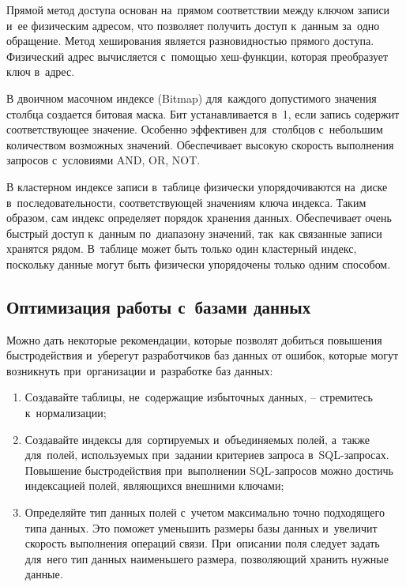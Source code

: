 \documentclass{ou}
\begin{document}
Прямой метод доступа основан на~прямом соответствии между ключом записи и~ее физическим адресом, что позволяет получить доступ к~данным за~одно обращение. Метод хеширования является разновидностью прямого доступа. Физический адрес вычисляется с~помощью хеш-функции, которая преобразует ключ в~адрес.

В двоичном масочном индексе (Bitmap) для~каждого допустимого значения столбца создается битовая маска. Бит устанавливается в~1, если запись содержит соответствующее значение. Особенно эффективен для~столбцов с~небольшим количеством возможных значений. Обеспечивает высокую скорость выполнения запросов с~условиями AND, OR, NOT\cite{Senchenko2015}.

В кластерном индексе записи в~таблице физически упорядочиваются на~диске в~последовательности, соответствующей значениям ключа индекса. Таким образом, сам индекс определяет порядок хранения данных. Обеспечивает очень быстрый доступ к~данным по~диапазону значений, так~как связанные записи хранятся рядом. В~таблице может быть только один кластерный индекс, поскольку данные могут быть физически упорядочены только одним способом.

\subsection{Оптимизация работы с~базами данных}
Можно дать некоторые рекомендации, которые позволят добиться повышения быстродействия и~уберегут разработчиков баз данных от ошибок, которые могут возникнуть при~организации и~разработке баз данных:
\begin{enumerate}[leftmargin=0em, itemindent=3.75em, nosep, label=\arabic*)]
\item Создавайте таблицы, не~содержащие избыточных данных, -- стремитесь к~нормализации;
\item Создавайте индексы для~сортируемых и~объединяемых полей, а~также для~полей, используемых при~задании критериев запроса в~SQL-запросах. Повышение быстродействия при~выполнении SQL-запросов можно достичь индексацией полей, являющихся внешними ключами;
\item Определяйте тип данных полей с~учетом максимально точно подходящего типа данных. Это поможет уменьшить размеры базы данных и~увеличит скорость выполнения операций связи. При~описании поля следует задать для~него тип данных наименьшего размера, позволяющий хранить нужные данные\cite{Senchenko2015}.
\end{enumerate}
\end{document}
